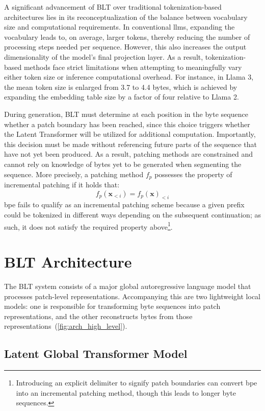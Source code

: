 A significant advancement of {\textsc BLT} over traditional tokenization-based architectures lies in its reconceptualization of the balance between vocabulary size and computational requirements. In conventional llms, expanding the vocabulary leads to, on average, larger tokens, thereby reducing the number of processing steps needed per sequence. However, this also increases the output dimensionality of the model’s final projection layer. As a result, tokenization-based methods face strict limitations when attempting to meaningfully vary either token size or inference computational overhead. For instance, in Llama 3, the mean token size is enlarged from 3.7 to 4.4 bytes, which is achieved by expanding the embedding table size by a factor of four relative to Llama 2.

During generation, {\textsc BLT} must determine at each position in the byte sequence whether a patch boundary has been reached, since this choice triggers whether the Latent Transformer will be utilized for additional computation. Importantly, this decision must be made without referencing future parts of the sequence that have not yet been produced. As a result, patching methods are constrained and cannot rely on knowledge of bytes yet to be generated when segmenting the sequence. More precisely, a patching method $f_p$ possesses the property of incremental patching if it holds that:
$$f_p(\pmb{x}_{<i}) = f_p(\pmb{x})_{<i}$$
bpe fails to qualify as an incremental patching scheme because a given prefix could be tokenized in different ways depending on the subsequent continuation; as such, it does not satisfy the required property above\footnote{Introducing an explicit delimiter to signify patch boundaries can convert bpe into an incremental patching method, though this leads to longer byte sequences.}.

\section{{\textsc BLT} Architecture}
\label{section:architecture}
The {\textsc BLT} system consists of a major global autoregressive language model that processes patch-level representations. Accompanying this are two lightweight local models: one is responsible for transforming byte sequences into patch representations, and the other reconstructs bytes from those representations~(\autoref{fig:arch_high_level}).

\subsection{Latent Global Transformer Model}

